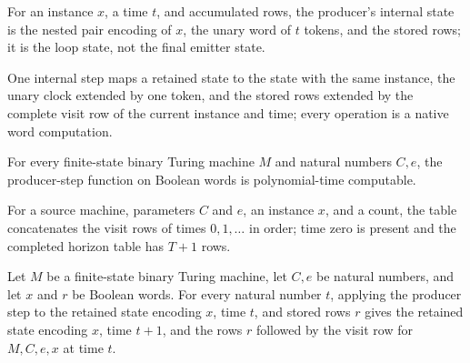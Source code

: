 \begin{definition}
\label{Complexity.clVisitState}
\leanok
{}
For an instance $x$, a time $t$, and accumulated rows, the producer's internal state is the nested pair encoding of $x$, the unary word of $t$ tokens, and the stored rows; it is the loop state, not the final emitter state.
\end{definition}

\begin{definition}
\label{Complexity.clVisitStep}
\leanok
{}
One internal step maps a retained state to the state with the same instance, the unary clock extended by one token, and the stored rows extended by the complete visit row of the current instance and time; every operation is a native word computation.
\end{definition}

\begin{lemma}
\label{Complexity.clVisitStep_native}
\leanok
{}
For every finite-state binary Turing machine $M$ and natural numbers $C,e$, the
producer-step function on Boolean words is polynomial-time computable.
\end{lemma}

\begin{definition}
\label{Complexity.clVisitRows}
\leanok
{}
For a source machine, parameters $C$ and $e$, an instance $x$, and a count, the table concatenates the visit rows of times $0, 1, \dots$ in order; time zero is present and the completed horizon table has $T + 1$ rows.
\end{definition}

\begin{lemma}
\label{Complexity.clVisitStep_state}
\leanok
{}
Let $M$ be a finite-state binary Turing machine, let $C,e$ be natural numbers, and let
$x$ and $r$ be Boolean words. For every natural number $t$, applying the producer step
to the retained state encoding $x$, time $t$, and stored rows $r$ gives the retained
state encoding $x$, time $t+1$, and the rows $r$ followed by the visit row for $M,C,e,x$
at time $t$.
\end{lemma}

